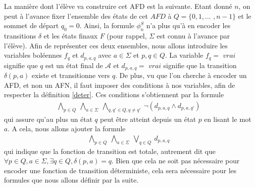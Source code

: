 \documentclass[12pt,a4paper,oneside,titlepage]{report}
\begin{document}
\noindent La manière dont l'élève va construire cet AFD est la suivante. Etant donné $n$, on peut à l'avance fixer l'ensemble des états de cet $AFD$  à $Q=\{0,1,...$ $,n-1\}$ et le sommet de départ $q_0=0$. Ainsi, la formule $\phi^S_n$ n'a plus qu'à en encoder les transitions $\delta$ et les états finaux $F$ (pour rappel, $\Sigma$ est connu à l'avance par l'élève). Afin de représenter ces deux ensembles, nous allons introduire les variables boléennes $f_q$ et $d_{p,a,q}$ avec $a\in\Sigma$ et $p,q\in Q$. La variable $f_q=$ $vrai$ signifie que $q$ est un état final de $\mathcal{A}$ et $d_{p,a,q}=$ $vrai$ signifie que la transition $\delta(p,a)$ existe et transitionne vers $q$. De plus, vu que l'on cherche à encoder un AFD, et non un AFN, il faut imposer des conditions à nos variables, afin de respecter la définition \ref{deter}. Ces conditions s'obtiennent par la formule
\begin{equation}
\label{booldeter1}
\begin{aligned} \bigwedge _{p \in Q}~ \bigwedge _{a \in \varSigma }~ \bigwedge _{q, q' \in Q, q \ne q'}~ \neg (d_{p, a, q} \land d_{p, a, q'}) \end{aligned}
\end{equation}
qui assure qu'au plus un état $q$ peut être atteint depuis un état $p$ en lisant le mot $a$. A cela, nous allons ajouter la formule 
\begin{equation}
\label{booldeter2}
\begin{aligned} \bigwedge _{p \in Q}~ \bigwedge _{a \in \varSigma }~ \bigvee _{q \in Q}~ d_{p, a, q} \end{aligned}
\end{equation}
qui indique que la fonction de transition est totale, autrement dit que $\forall p\in Q, a\in\Sigma, \exists q\in Q, \delta(p,a)=q$. Bien que cela ne soit pas nécessaire pour encoder une fonction de transition déterministe, cela sera nécessaire pour les formules que nous allons définir par la suite.
\end{document}

